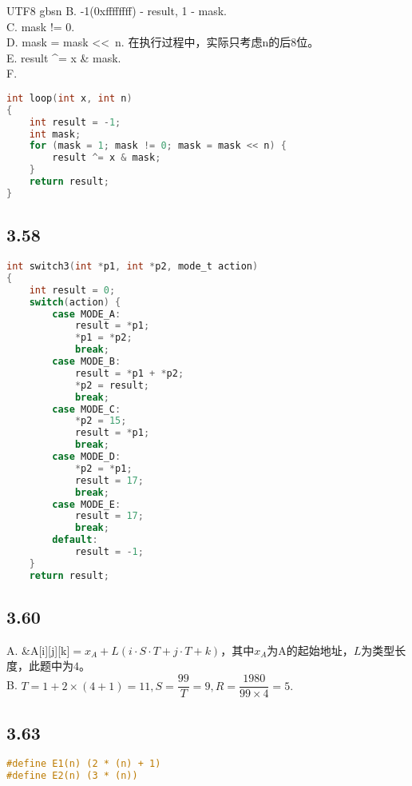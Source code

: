 \documentclass {article}
\begin{document}
\begin {CJK*} {UTF8} {gbsn}
	  B. -1(0xffffffff) - result, 1 - mask.\\

	  C. mask != 0.\\

	  D. mask = mask \textless\textless\ n. 在执行过程中，实际只考虑n的后8位。\\

	  E. result \textasciicircum = x \& mask.\\

	  F.
	  \begin{lstlisting}[language=C]
int loop(int x, int n)
{
	int result = -1;
	int mask;
	for (mask = 1; mask != 0; mask = mask << n) {
		result ^= x & mask;
	}
	return result;
}
	  \end{lstlisting}

	\subsection{3.58}
	  \begin{lstlisting}[language=C]
int switch3(int *p1, int *p2, mode_t action)
{
	int result = 0;
	switch(action) {
		case MODE_A:
			result = *p1;
			*p1 = *p2;
			break;
		case MODE_B:
			result = *p1 + *p2;
			*p2 = result;
			break;
		case MODE_C:
			*p2 = 15;
			result = *p1;
			break;
		case MODE_D:
			*p2 = *p1;
			result = 17;
			break;
		case MODE_E:
			result = 17;
			break;
		default:
			result = -1;
	}
	return result;
	  \end{lstlisting}

	\subsection{3.60}
	  A. \&A[i][j][k]$=x_A+L(i\cdot S\cdot T+j\cdot  T+k)$，其中$x_A$为A的起始地址，$L$为类型长度，此题中为$4$。\\

	  B. $T=1+2\times(4+1)=11,S=\dfrac{99}{T}=9,R=\dfrac{1980}{99\times 4}=5.$\\

	\subsection{3.63}
	  \begin{lstlisting}[language=C]
#define E1(n) (2 * (n) + 1)
#define E2(n) (3 * (n))
	  \end{lstlisting}

  \end {CJK*}
\end{document}
